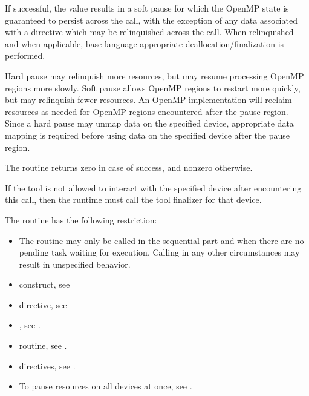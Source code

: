 If successful, the  value results in a soft pause for which the OpenMP state 
is guaranteed to persist across the call, with the exception of any data associated with a
  directive which may be relinquished across the call. 
When relinquished and when applicable, base language appropriate deallocation/finalization is performed. 

\begin{note}
Hard pause may relinquish more resources, but may resume processing OpenMP regions more slowly. 
Soft pause allows OpenMP regions to restart more quickly, but may relinquish fewer resources. 
An OpenMP implementation will reclaim resources as needed for OpenMP regions encountered after the pause region. 
Since  a hard pause may unmap data on the specified device, appropriate data mapping is required before 
using data on the specified device after the pause region.
 \end{note}
 
The routine returns zero in case of success, and nonzero otherwise.

\tools

If the tool is not allowed to interact with the specified device after encountering this call, then the runtime must call
the tool finalizer for that device.

\restrictions
The  routine has the following restriction:

\begin{itemize}
\item The routine may only be called in the sequential part and when there are no pending 
task waiting for execution. Calling in any other circumstances may result in unspecified behavior.
\end{itemize}

\crossreferences

\begin{itemize}

\item {} construct, see

\item {} directive, see

\item {}, see
.

\item {} routine, see
.

\item {} directives, see
.

\item To pause resources on all devices at once, see
.
\end{itemize}

